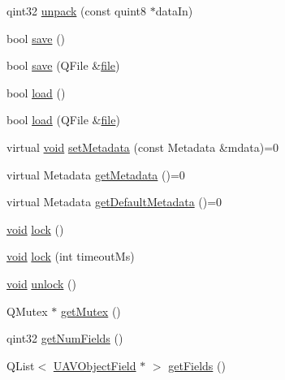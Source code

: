 \begin{DoxyCompactItemize}
qint32 \hyperlink{group___u_a_v_objects_plugin_ga4ec5169680d4a03161752e98fd98a3b6}{unpack} (const quint8 $\ast$data\-In)
\item 
bool \hyperlink{group___u_a_v_objects_plugin_ga7c5e9973653217674183bfa3ba10e217}{save} ()
\item 
bool \hyperlink{group___u_a_v_objects_plugin_ga6b936966d89fb80b1138100edcd3e4cc}{save} (\-Q\-File \&\hyperlink{uavobjecttemplate_8m_a97c04efa65bcf0928abf9260bc5cbf46}{file})
\item 
bool \hyperlink{group___u_a_v_objects_plugin_ga8e49ecfdebf22f4834d1fc22d3effae7}{load} ()
\item 
bool \hyperlink{group___u_a_v_objects_plugin_ga0c4bcaec65373c03a2dbf22beae1e8a3}{load} (\-Q\-File \&\hyperlink{uavobjecttemplate_8m_a97c04efa65bcf0928abf9260bc5cbf46}{file})
\item 
virtual \hyperlink{group___u_a_v_objects_plugin_ga444cf2ff3f0ecbe028adce838d373f5c}{void} \hyperlink{group___u_a_v_objects_plugin_ga6cca5e5bf5d4f7ecfb03ef7cc9a93a95}{set\-Metadata} (const \-Metadata \&mdata)=0
\item 
virtual \-Metadata \hyperlink{group___u_a_v_objects_plugin_gaadeb5af3a70679bcb2b6360274e9c7de}{get\-Metadata} ()=0
\item 
virtual \-Metadata \hyperlink{group___u_a_v_objects_plugin_ga565410bc4fc71be87c359024f6cc8f3c}{get\-Default\-Metadata} ()=0
\item 
\hyperlink{group___u_a_v_objects_plugin_ga444cf2ff3f0ecbe028adce838d373f5c}{void} \hyperlink{group___u_a_v_objects_plugin_ga02661eea30150b9d24bc3a16423850b8}{lock} ()
\item 
\hyperlink{group___u_a_v_objects_plugin_ga444cf2ff3f0ecbe028adce838d373f5c}{void} \hyperlink{group___u_a_v_objects_plugin_ga17770eb02bf711b734a041622dccf889}{lock} (int timeout\-Ms)
\item 
\hyperlink{group___u_a_v_objects_plugin_ga444cf2ff3f0ecbe028adce838d373f5c}{void} \hyperlink{group___u_a_v_objects_plugin_ga2729ba3111341341127946ff1b9bb377}{unlock} ()
\item 
\-Q\-Mutex $\ast$ \hyperlink{group___u_a_v_objects_plugin_ga07e3fbd0f6a85b23e03afc165456a0ef}{get\-Mutex} ()
\item 
qint32 \hyperlink{group___u_a_v_objects_plugin_gab9b1f7925306319ea21f599bba0d227f}{get\-Num\-Fields} ()
\item 
\-Q\-List$<$ \hyperlink{class_u_a_v_object_field}{\-U\-A\-V\-Object\-Field} $\ast$ $>$ \hyperlink{group___u_a_v_objects_plugin_ga043de5085e6ade44abfb005e320d10ca}{get\-Fields} ()

\end{DoxyCompactItemize}
